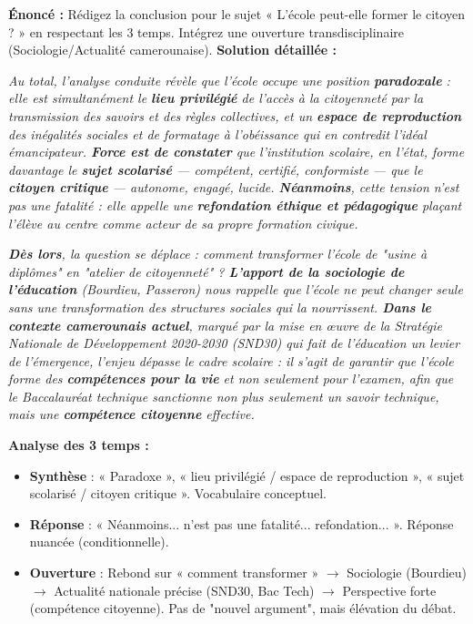 \documentclass[11pt]{article}
\newcommand{\cle}[1]{{\popxbold\color{popdark}#1}}
\begin{document}
\begin{exoresolu}
    \textbf{Énoncé :} Rédigez la conclusion pour le sujet « L'école peut-elle former le citoyen ? » en respectant les 3 temps. Intégrez une ouverture transdisciplinaire (Sociologie/Actualité camerounaise).
    \tcblower
    \textbf{Solution détaillée :}
    
    \emph{Au total, l'analyse conduite révèle que l'école occupe une position \textbf{paradoxale} : elle est simultanément le \textbf{lieu privilégié} de l'accès à la citoyenneté par la transmission des savoirs et des règles collectives, et un \textbf{espace de reproduction} des inégalités sociales et de formatage à l'obéissance qui en contredit l'idéal émancipateur. \textbf{Force est de constater} que l'institution scolaire, en l'état, forme davantage le \textbf{sujet scolarisé} — compétent, certifié, conformiste — que le \textbf{citoyen critique} — autonome, engagé, lucide. \textbf{Néanmoins}, cette tension n'est pas une fatalité : elle appelle une \textbf{refondation éthique et pédagogique} plaçant l'élève au centre comme acteur de sa propre formation civique.}
    
    \emph{\textbf{Dès lors}, la question se déplace : comment transformer l'école de "usine à diplômes" en "atelier de citoyenneté" ? \textbf{L'apport de la sociologie de l'éducation} (Bourdieu, Passeron) nous rappelle que l'école ne peut changer seule sans une transformation des structures sociales qui la nourrissent. \textbf{Dans le contexte camerounais actuel}, marqué par la mise en œuvre de la \cle{Stratégie Nationale de Développement 2020-2030 (SND30)} qui fait de l'éducation un levier de l'émergence, l'enjeu dépasse le cadre scolaire : il s'agit de garantir que l'école forme des \textbf{compétences pour la vie} et non seulement pour l'examen, afin que le \cle{Baccalauréat technique} sanctionne non plus seulement un savoir technique, mais une \textbf{compétence citoyenne} effective.}
    
    \textbf{Analyse des 3 temps :}
    \begin{itemize}
        \item \textbf{Synthèse} : « Paradoxe », « lieu privilégié / espace de reproduction », « sujet scolarisé / citoyen critique ». Vocabulaire conceptuel.
        \item \textbf{Réponse} : « Néanmoins... n'est pas une fatalité... refondation... ». Réponse nuancée (conditionnelle).
        \item \textbf{Ouverture} : Rebond sur « comment transformer » $\rightarrow$ Sociologie (Bourdieu) $\rightarrow$ Actualité nationale précise (SND30, Bac Tech) $\rightarrow$ Perspective forte (compétence citoyenne). Pas de "nouvel argument", mais élévation du débat.
    \end{itemize}
\end{exoresolu}
\end{document}
